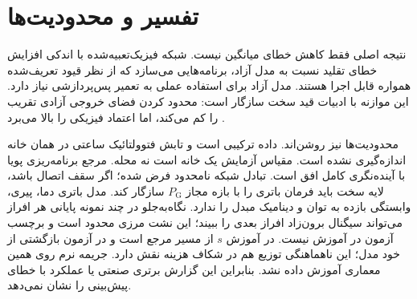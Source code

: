 \section{تفسیر و محدودیت‌ها}
نتیجه اصلی فقط کاهش خطای میانگین نیست. شبکه فیزیک‌تعبیه‌شده با اندکی افزایش خطای تقلید نسبت به مدل آزاد، برنامه‌هایی می‌سازد که از نظر قیود تعریف‌شده همواره قابل اجرا هستند. مدل آزاد برای استفاده عملی به تعمیر پس‌پردازشی نیاز دارد. این موازنه با ادبیات قید سخت سازگار است: محدود کردن فضای خروجی آزادی تقریب را کم می‌کند، اما اعتماد فیزیکی را بالا می‌برد .

محدودیت‌ها نیز روشن‌اند. داده ترکیبی است و تابش فتوولتائیک ساعتی در همان خانه اندازه‌گیری نشده است. مقیاس آزمایش یک خانه است نه محله. مرجع برنامه‌ریزی پویا با آینده‌نگری کامل افق است. تبادل شبکه نامحدود فرض شده؛ اگر سقف اتصال باشد، لایه سخت باید فرمان باتری را با بازه مجاز $P_{\mathrm{G}}$ سازگار کند. مدل باتری دما، پیری، وابستگی بازده به توان و دینامیک مبدل را ندارد. نگاه‌به‌جلو در چند نمونه پایانی هر افراز می‌تواند سیگنال برون‌زاد افراز بعدی را ببیند؛ این نشت مرزی محدود است و برچسب آزمون در آموزش نیست. در آموزش $s$ از مسیر مرجع است و در آزمون بازگشتی از خود مدل؛ این ناهماهنگی توزیع هم در شکاف هزینه نقش دارد. جریمه نرم روی همین معماری آموزش داده نشد. بنابراین این گزارش برتری صنعتی یا عملکرد با خطای پیش‌بینی را نشان نمی‌دهد.

